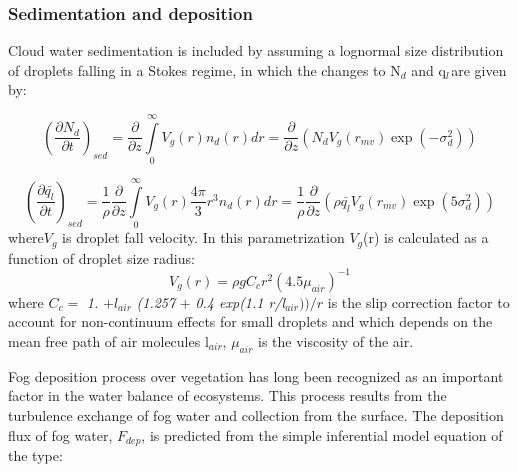 \subsubsection{ Sedimentation and deposition}
Cloud water sedimentation is included by assuming a lognormal size
distribution of droplets falling in a Stokes regime, in which the changes to
N$_{d}$ and q$_{l\, }$are given by:

\begin{equation}
\left( \frac{\partial N_{d}}{\partial t} \right)_{sed}=\frac{\partial
}{\partial z}\int\limits_0^\infty {V_{g}\left( r \right)n_{d}\left( r
\right)dr} =\frac{\partial }{\partial z}\left( N_{d}V_{g}\left( r_{mv}
\right)\exp \left( -\sigma_{d}^{2} \right) \right)
\end{equation}

\begin{equation}
\left( \frac{\partial \bar{q_{l}}}{\partial t} \right)_{sed}=\frac{1}{\rho
}\frac{\partial }{\partial z}\int\limits_0^\infty {V_{g}\left( r
\right)\frac{4\pi }{3}r^{3}n_{d}\left( r \right)dr} =\frac{1}{\rho
}\frac{\partial }{\partial z}\left( \rho \bar{q_{l}}V_{g}\left( r_{mv}
\right)\exp \left( 5\sigma_{d}^{2} \right) \right)
\end{equation}
\newline
where$ V_{g}$ is droplet fall velocity.
\newline
In this parametrization $V_{g}$(r) is calculated as a function of droplet
size radius:
\begin{equation}
V_{g}\left( r \right)=\rho gC_{c}r^{2}\left( 4.5\mu_{air} \right)^{-1}
\end{equation}
where $C_{c} =$\textit{ 1. }$+ l_{air}$\textit{ (1.257 }$+$\textit{ 0.4 exp(1.1 r/l}$_{air}))/r$ is the slip correction factor to
account for non-continuum effects for small droplets and which depends on
the mean free path of air molecules l$_{air}$, $\mu_{air}$ is the
viscosity of the air.

Fog deposition process over vegetation has long been recognized as an
important factor in the water balance of ecosystems. This process results
from the turbulence exchange of fog water and collection from the surface.
The deposition flux of fog water, $F_{dep}$, is predicted from the simple
inferential model equation of the type:

